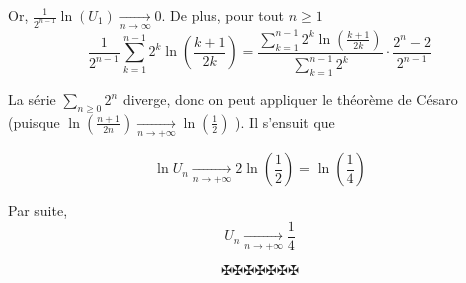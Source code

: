Or, $\frac{1}{2^{n - 1}} \ln (U_1) \xrightarrow[n \to \infty]{} 0$. De plus,
pour tout $ \text{} n \geq 1$
\[ \frac{1}{2^{n - 1}}  \sum_{k = 1}^{n - 1} 2^k \ln \left( \frac{k + 1}{2 k}
   \right) = \frac{\sum_{k = 1}^{n - 1} 2^k \ln \left( \frac{k + 1}{2 k}
   \right)}{\sum_{k = 1}^{n - 1} 2^k} \cdot \frac{2^n - 2}{2^{n - 1}} \]


La s{\'e}rie $\underset{n \geq 0}{\sum}  2^n$ diverge, donc on peut appliquer
le th{\'e}or{\`e}me de C{\'e}saro (puisque $\ln \left( \frac{n + 1}{2 n}
\right) \xrightarrow[n \rightarrow + \infty]{} \ln \left( \frac{1}{2} \right)$
). Il s'ensuit que


\[ \ln U_n \xrightarrow[n \to + \infty]{} 2 \ln \left( \frac{1}{2} \right) =
   \ln \left( \frac{1}{4} \right) \]


Par suite,
\[ U_n \xrightarrow[n \to + \infty]{} \frac{1}{4} \]

\[ \maltese \maltese \maltese \maltese \maltese \maltese \maltese \]
